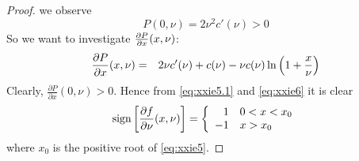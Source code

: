 \documentclass[11pt,a4]{amsart}
\newcommand{\pd}{\partial}
\newcommand{\1}{{\mathbf 1}}
\begin{document}
\begin{proof}
  we observe
  \begin{equation}
    \label{eq:xxie5.1}
    P(0, \nu) = 2 \nu^2 c'(\nu) > 0
  \end{equation}
  So we want to investigate ${\pd P \over \pd x}(x, \nu)$:
  \begin{eqnarray}
    {\pd P \over \pd x}(x, \nu) &=&
    2 \nu c'(\nu) + c(\nu) - \nu c(\nu) \ln\left(
      1 + {x \over \nu}
    \right)
    \label{eq:xxie6}
  \end{eqnarray}
  Clearly, $\frac{\pd P}{\pd x}(0, \nu) > 0$. Hence from
  \eqref{eq:xxie5.1} and
  \eqref{eq:xxie6} it is clear
  \begin{equation*}
    \text{sign}\left[
      {\pd f \over \pd\nu}(x, \nu)
    \right]
    = \left\{
    \begin{array}{rl}
      1 & 0 < x < x_0 \\
      -1 & x > x_0
    \end{array}
    \right.
  \end{equation*}
  where $x_0$ is the positive root of \eqref{eq:xxie5}.
\end{proof}
\end{document}

